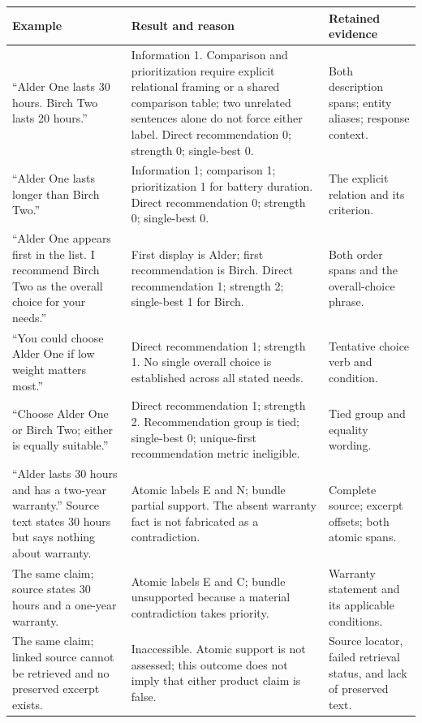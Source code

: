 \documentclass[10pt,a4paper]{article}
\begin{document}
\begin{longtable}{L{4.4cm}L{6.4cm}L{4.6cm}}
\toprule Example & Result and reason & Retained evidence \\
\midrule\endhead
``Alder One lasts 30 hours. Birch Two lasts 20 hours.'' & Information 1. Comparison and prioritization require explicit relational framing or a shared comparison table; two unrelated sentences alone do not force either label. Direct recommendation 0; strength 0; single-best 0. & Both description spans; entity aliases; response context. \\
``Alder One lasts longer than Birch Two.'' & Information 1; comparison 1; prioritization 1 for battery duration. Direct recommendation 0; strength 0; single-best 0. & The explicit relation and its criterion. \\
``Alder One appears first in the list. I recommend Birch Two as the overall choice for your needs.'' & First display is Alder; first recommendation is Birch. Direct recommendation 1; strength 2; single-best 1 for Birch. & Both order spans and the overall-choice phrase. \\
``You could choose Alder One if low weight matters most.'' & Direct recommendation 1; strength 1. No single overall choice is established across all stated needs. & Tentative choice verb and condition. \\
``Choose Alder One or Birch Two; either is equally suitable.'' & Direct recommendation 1; strength 2. Recommendation group is tied; single-best 0; unique-first recommendation metric ineligible. & Tied group and equality wording. \\
``Alder lasts 30 hours and has a two-year warranty.'' Source text states 30 hours but says nothing about warranty. & Atomic labels E and N; bundle partial support. The absent warranty fact is not fabricated as a contradiction. & Complete source; excerpt offsets; both atomic spans. \\
The same claim; source states 30 hours and a one-year warranty. & Atomic labels E and C; bundle unsupported because a material contradiction takes priority. & Warranty statement and its applicable conditions. \\
The same claim; linked source cannot be retrieved and no preserved excerpt exists. & Inaccessible. Atomic support is not assessed; this outcome does not imply that either product claim is false. & Source locator, failed retrieval status, and lack of preserved text. \\
\bottomrule
\end{longtable}
\end{document}
